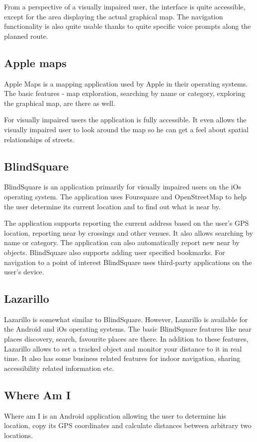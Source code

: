 \documentclass[nolof,digital]{fithesis3}
\begin{document}
From a perspective of a visually impaired user, the interface is quite accessible, except for the area displaying the actual graphical map. The navigation functionality is also quite usable thanks to quite specific voice prompts along the planned route.
\subsection{Apple maps}
Apple Maps \parencite{applemaps} is a mapping application used by Apple in their operating systems. The basic features - map exploration, searching by name or category, exploring the graphical map, are there as well.

For visually impaired users the application is fully accessible. It even allows the visually impaired user to look around the map so he can get a feel about spatial relationships of streets.
\subsection{BlindSquare}
BlindSquare \parencite{blindsquare} is an application primarily for visually impaired users on the iOs operating system. The application uses Foursquare and OpenStreetMap to help the user determine its current location and to find out what is near by.

The application supports reporting the current address based on the user's GPS location, reporting near by crossings and other venues. It also allows searching by name or category. The application can also automatically report new near by objects. BlindSquare also supports adding user specified bookmarks. For navigation to a point of interest BlindSquare uses third-party applications on the user's device.
\subsection{Lazarillo}
Lazarillo \parencite{lazarillo} is somewhat similar to BlindSquare. However, Lazarillo is available for the Android and iOs operating systems. The basic BlindSquare features like near places discovery, search, favourite places are there. In addition to these features, Lazarillo allows to set a tracked object and monitor your distance to it in real time. It also has some business related features for indoor navigation, sharing accessibility related information etc.
\subsection{Where Am I}
Where am I \parencite{whereami} is an Android application allowing the user to determine his location, copy its GPS coordinates and calculate distances between arbitrary two locations.
\end{document}
